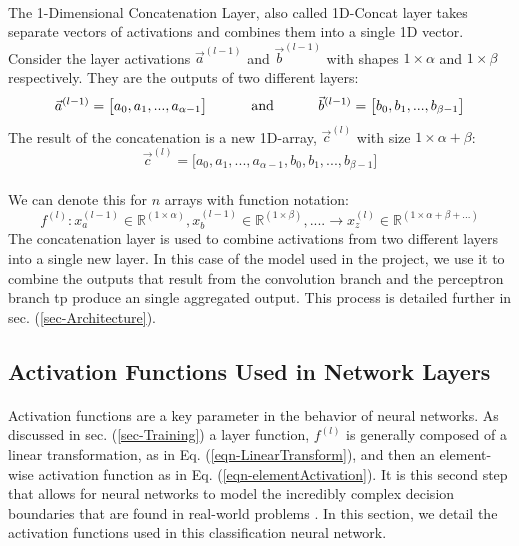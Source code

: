 \documentclass[12pt,letterpaper]{article}
\begin{document}
\paragraph*{}The 1-Dimensional Concatenation Layer, also called 1D-Concat layer takes separate vectors of activations and combines them into a single 1D vector. Consider the layer activations $\vec{a}^{(l-1)}$ and $\vec{b}^{(l-1)}$ with shapes  $1 \times \alpha$ and $1 \times \beta$ respectively. They are the outputs of two different layers:
\begin{equation}
\vec{a}^{(l-1)} = \big[ a_{0},  a_{1}, ... ,  a_{\alpha-1} \big]
\text{\hspace{1cm} and \hspace{1cm}}
\vec{b}^{(l-1)} = \big[ b_{0},  b_{1}, ... ,  b_{\beta-1} \big]
\end{equation}
The result of the concatenation is a new 1D-array, $\vec{c}^{(l)}$ with size $1 \times \alpha + \beta$:
\begin{equation}
\vec{c}^{(l)} = \big[ a_{0},  a_{1}, ... ,  a_{\alpha-1}, b_{0},  b_{1}, ... ,  b_{\beta-1} \big]
\end{equation}

\paragraph*{}We can denote this for $n$ arrays with function notation:
\begin{equation}
\label{eqn-ConcatenationFunction}
f^{(l)} : x^{(l-1)}_{a} \in \mathbb{R}^{(1 \times \alpha)} , x^{(l-1)}_{b} \in \mathbb{R}^{(1 \times \beta)} , ....  \rightarrow
x^{(l)}_{z} \in \mathbb{R}^{(1 \times \alpha + \beta + ...)}
\end{equation}
The concatenation layer is used to combine activations from two different layers into a single new layer. In this case of the model used in the project, we use it to combine the outputs that result from the convolution branch and the perceptron branch tp produce an single aggregated output. This process is detailed further in sec. (\ref{sec-Architecture}).


\subsection{Activation Functions Used in Network Layers}
\label{sec-ActivationFunctions}

\paragraph*{}Activation functions are a key parameter in the behavior of neural networks. As discussed in sec. (\ref{sec-Training}) a layer function, $f^{(l)}$ is generally composed of a linear transformation, as in Eq. (\ref{eqn-LinearTransform}), and then an element-wise activation function as in Eq. (\ref{eqn-elementActivation}). It is this second step that allows for neural networks to model the incredibly complex decision boundaries that are found in real-world problems \cite{Geron,Loy}. In this section, we detail the activation functions used in this classification neural network. 
\end{document}
